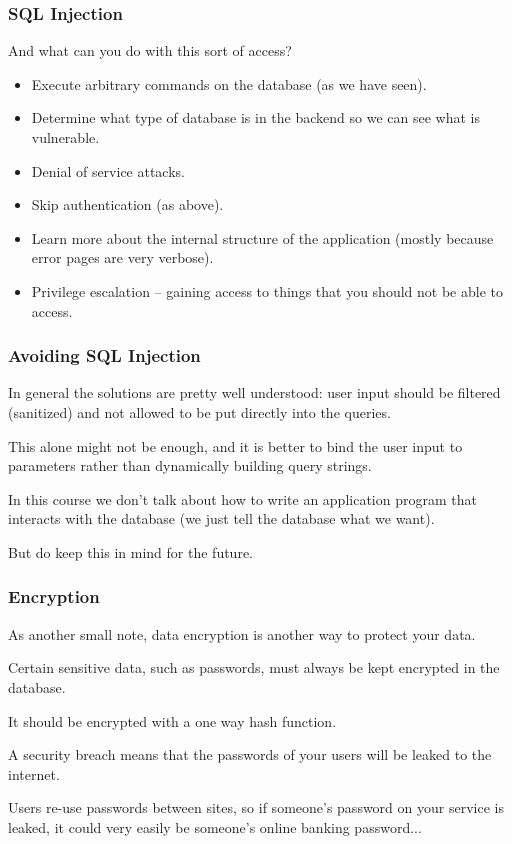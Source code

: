 \begin{frame}
\frametitle{SQL Injection}

And what can you do with this sort of access?
\begin{itemize}
	\item Execute arbitrary commands on the database (as we have seen).
	\item Determine what type of database is in the backend so we can see what is vulnerable.
	\item Denial of service attacks.
	\item Skip authentication (as above).
	\item Learn more about the internal structure of the application (mostly because error pages are very verbose).
	\item Privilege escalation -- gaining access to things that you should not be able to access.
\end{itemize}

\end{frame}



\begin{frame}
\frametitle{Avoiding SQL Injection}

In general the solutions are pretty well understood: user input should be filtered (sanitized) and not allowed to be put directly into the queries. 

This alone might not be enough, and it is better to bind the user input to parameters rather than dynamically building query strings. 

In this course we don't talk about how to write an application program that interacts with the database (we just tell the database what we want). 

But do keep this in mind for the future.


\end{frame}



\begin{frame}
\frametitle{Encryption}

As another small note, data encryption is another way to protect your data. 

Certain sensitive data, such as passwords, must always be kept encrypted in the database. 

It should be encrypted with a one way hash function. 

A security breach means that the passwords of your users will be leaked to the internet.

Users re-use passwords between sites, so if someone's password on your service is leaked, it could very easily be someone's online banking password...


\end{frame}



